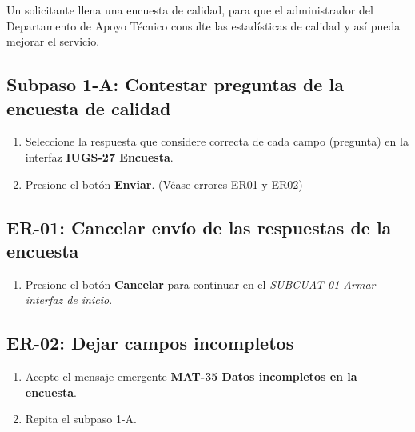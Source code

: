 Un solicitante llena una encuesta de calidad, para que el administrador
	del Departamento de Apoyo Técnico consulte las estadísticas de calidad
	y así pueda mejorar el servicio.
  
  \subsection{Subpaso 1-A: Contestar preguntas de la encuesta de calidad}
\begin{enumerate}
	\item Seleccione la respuesta que considere correcta de cada campo (pregunta)
  en la interfaz \textbf{IUGS-27 Encuesta}.
	\item Presione el botón \textbf{Enviar}. (Véase errores ER01 y ER02)
\end{enumerate}

  \subsection{ER-01: Cancelar envío de las respuestas de la encuesta}
\begin{enumerate}
	\item Presione el botón \textbf{Cancelar} para continuar en el
  \textit{SUBCUAT-01 Armar interfaz de inicio}.
\end{enumerate}

  \subsection{ER-02: Dejar campos incompletos}
\begin{enumerate}
	\item Acepte el mensaje emergente \textbf{MAT-35 Datos incompletos en la encuesta}.
	\item Repita el subpaso 1-A.
\end{enumerate}
